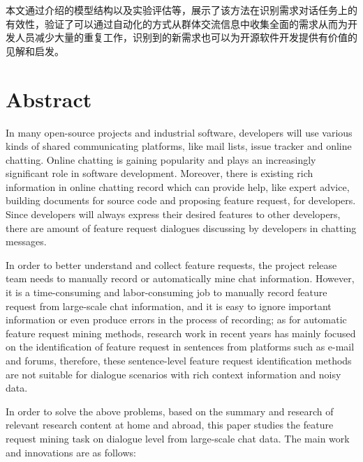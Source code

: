 本文通过介绍{\tool}的模型结构以及实验评估等，展示了该方法在识别需求对话任务上的有效性，验证了{\tool}可以通过自动化的方式从群体交流信息中收集全面的需求从而为开发人员减少大量的重复工作，识别到的新需求也可以为开源软件开发提供有价值的见解和启发。


\intobmk\chapter*{Abstract}%
In many open-source projects and industrial software, developers will use various kinds of shared communicating platforms, like mail lists, issue tracker and online chatting. 
Online chatting is gaining popularity and plays an increasingly significant role in software development. Moreover, there is existing rich information in online chatting record which can provide help, like expert advice, building documents for source code and proposing feature request, for developers. Since developers will always express their desired features to other developers, there are amount of feature request dialogues discussing by developers in chatting messages.

In order to better understand and collect feature requests, the project release team needs to manually record or automatically mine chat information. However, it is a time-consuming and labor-consuming job to manually record feature request from large-scale chat information, and it is easy to ignore important information or even produce errors in the process of recording; as for automatic feature request mining methods, research work in recent years has mainly focused on the identification of feature request in sentences from platforms such as e-mail and forums, therefore, these sentence-level feature request identification methods are not suitable for dialogue scenarios with rich context information and noisy data.

In order to solve the above problems, based on the summary and research of relevant research content at home and abroad, this paper studies the feature request mining task on dialogue level from large-scale chat data. The main work and innovations are as follows:

